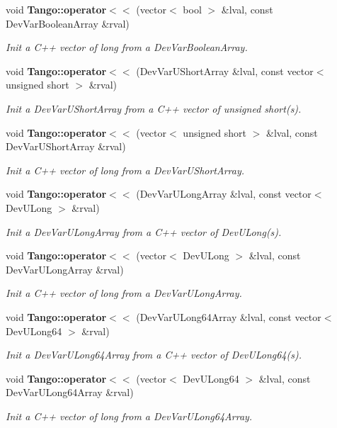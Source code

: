 \begin{DoxyCompactItemize}
void {\bf Tango\-::operator$<$$<$} (vector$<$ bool $>$ \&lval, const Dev\-Var\-Boolean\-Array \&rval)
\begin{DoxyCompactList}\small\item\em Init a C++ vector of long from a Dev\-Var\-Boolean\-Array. \end{DoxyCompactList}\item 
void {\bf Tango\-::operator$<$$<$} (Dev\-Var\-U\-Short\-Array \&lval, const vector$<$ unsigned short $>$ \&rval)
\begin{DoxyCompactList}\small\item\em Init a Dev\-Var\-U\-Short\-Array from a C++ vector of unsigned short(s). \end{DoxyCompactList}\item 
void {\bf Tango\-::operator$<$$<$} (vector$<$ unsigned short $>$ \&lval, const Dev\-Var\-U\-Short\-Array \&rval)
\begin{DoxyCompactList}\small\item\em Init a C++ vector of long from a Dev\-Var\-U\-Short\-Array. \end{DoxyCompactList}\item 
void {\bf Tango\-::operator$<$$<$} (Dev\-Var\-U\-Long\-Array \&lval, const vector$<$ Dev\-U\-Long $>$ \&rval)
\begin{DoxyCompactList}\small\item\em Init a Dev\-Var\-U\-Long\-Array from a C++ vector of Dev\-U\-Long(s). \end{DoxyCompactList}\item 
void {\bf Tango\-::operator$<$$<$} (vector$<$ Dev\-U\-Long $>$ \&lval, const Dev\-Var\-U\-Long\-Array \&rval)
\begin{DoxyCompactList}\small\item\em Init a C++ vector of long from a Dev\-Var\-U\-Long\-Array. \end{DoxyCompactList}\item 
void {\bf Tango\-::operator$<$$<$} (Dev\-Var\-U\-Long64\-Array \&lval, const vector$<$ Dev\-U\-Long64 $>$ \&rval)
\begin{DoxyCompactList}\small\item\em Init a Dev\-Var\-U\-Long64\-Array from a C++ vector of Dev\-U\-Long64(s). \end{DoxyCompactList}\item 
void {\bf Tango\-::operator$<$$<$} (vector$<$ Dev\-U\-Long64 $>$ \&lval, const Dev\-Var\-U\-Long64\-Array \&rval)
\begin{DoxyCompactList}\small\item\em Init a C++ vector of long from a Dev\-Var\-U\-Long64\-Array. \end{DoxyCompactList}\item 

\end{DoxyCompactItemize}
